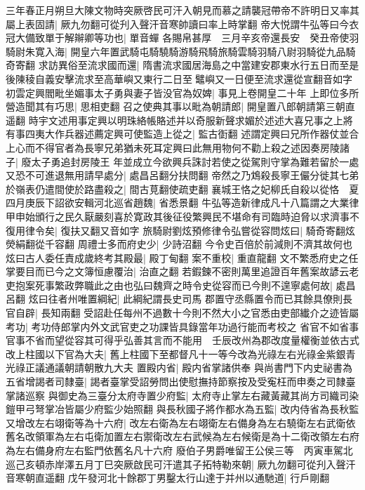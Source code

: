 三年春正月朔旦大陳文物時突厥啓民可汗入朝見而慕之請襲冠帶帝不許明日又率其屬上表固請|{
	厥九勿翻可從刋入聲汗音寒帥讀曰率上時掌翻}
帝大悦謂牛弘等曰今衣冠大備致單于解辮卿等功也|{
	單音蟬}
各賜帛甚厚　三月辛亥帝還長安　癸丑帝使羽騎尉朱寛入海|{
	開皇六年置武騎屯騎驍騎游騎飛騎旅騎雲騎羽騎八尉羽騎從九品騎奇寄翻}
求訪異俗至流求國而還|{
	隋書流求國居海島之中當建安郡東水行五日而至是後陳稜自義安擊流求至高華嶼又東行二日至鼊嶼又一日便至流求還從宣翻音如字}
初雲定興閻毗坐媚事太子勇與妻子皆没官為奴婢|{
	事見上卷開皇二十年}
上即位多所營造聞其有巧思|{
	思相吏翻}
召之使典其事以毗為朝請郎|{
	開皇置八郎朝請第三朝直遥翻}
時宇文述用事定興以明珠絡帳賂述并以奇服新聲求媚於述述大喜兄事之上將有事四夷大作兵器述薦定興可使監造上從之|{
	監古衘翻}
述謂定興曰兄所作器仗並合上心而不得官者為長寧兄弟猶未死耳定興曰此無用物何不勸上殺之述因奏房陵諸子|{
	廢太子勇追封房陵王}
年並成立今欲興兵誅討若使之從駕則守掌為難若留於一處又恐不可進退無用請早處分|{
	處昌呂翻分扶問翻}
帝然之乃鴆殺長寧王儼分徙其七弟於嶺表仍遣間使於路盡殺之|{
	間古莧翻使疏吏翻}
襄城王恪之妃柳氏自殺以從恪　夏四月庚辰下詔欲安輯河北巡省趙魏|{
	省悉景翻}
牛弘等造新律成凡十八篇謂之大業律甲申始頒行之民久厭嚴刻喜於寛政其後征役繁興民不堪命有司臨時迫脅以求濟事不復用律令矣|{
	復扶又翻又音如字}
旅騎尉劉炫預修律令弘嘗從容問炫曰|{
	騎奇寄翻炫熒絹翻從千容翻}
周禮士多而府史少|{
	少詩沼翻}
今令史百倍於前減則不濟其故何也炫曰古人委任責成歲終考其殿最|{
	殿丁甸翻}
案不重校|{
	重直龍翻}
文不繁悉府史之任掌要目而已今之文簿恒慮覆治|{
	治直之翻}
若鍜鍊不密則萬里追證百年舊案故諺云老吏抱案死事繁政弊職此之由也弘曰魏齊之時令史從容而已今則不遑寧處何故|{
	處昌呂翻}
炫曰往者州唯置綱紀|{
	此綱紀謂長史司馬}
郡置守丞縣置令而已其餘具僚則長官自辟|{
	長知兩翻}
受詔赴任每州不過數十今則不然大小之官悉由吏部纎介之迹皆屬考功|{
	考功侍郎掌内外文武官吏之功課皆具錄當年功過行能而考校之}
省官不如省事官事不省而望從容其可得乎弘善其言而不能用　壬辰改州為郡改度量權衡並依古式改上柱國以下官為大夫|{
	舊上柱國下至都督凡十一等今改為光祿左右光祿金紫銀青光祿正議通議朝請朝散九大夫}
置殿内省|{
	殿内省掌諸供奉}
與尚書門下内史祕書為五省增謁者司隸臺|{
	謁者臺掌受詔勞問出使慰撫持節察按及受寃枉而申奏之司隸臺掌諸巡察}
與御史為三臺分太府寺置少府監|{
	太府寺止掌左右藏黃藏其尚方司織司染鎧甲弓弩掌冶皆屬少府監少始照翻}
與長秋國子將作都水為五監|{
	改内侍省為長秋監}
又增改左右翊衛等為十六府|{
	改左右衛為左右翊衛左右備身為左右驍衛左右武衛依舊名改領軍為左右屯衛加置左右禦衛改左右武候為左右候衛是為十二衛改領左右府為左右備身府左右監門依舊名凡十六府}
廢伯子男爵唯留王公侯三等　丙寅車駕北巡己亥頓赤岸澤五月丁巳突厥啟民可汗遣其子拓特勒來朝|{
	厥九勿翻可從刋入聲汗音寒朝直遥翻}
戊午發河北十餘郡丁男鑿太行山達于并州以通馳道|{
	行戶剛翻}
